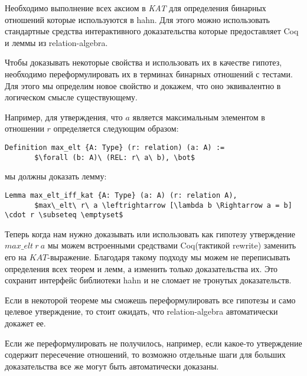 \documentclass[times
              ]{itmo-student-thesis}
\begin{document}
   Необходимо выполнение всех аксиом в \textit{KAT} для определения бинарных отношений которые используются в hahn. Для этого можно использовать стандартные средства интерактивного доказательства которые предоставляет Coq и леммы из relation-algebra.


   Чтобы доказывать некоторые свойства и использовать их в качестве гипотез, необходимо переформулировать их в терминах бинарных отношений с тестами. Для этого мы определим новое свойство и докажем, что оно эквивалентно в логическом смысле существующему.

   Например, для утверждения, что $a$ является максимальным элементом в отношении $r$ определяется следующим образом:
   \begin{lstlisting}[float=!h,caption={Определение max\_elt в hahn},label={lst1},mathescape=true]
     Definition max_elt {A: Type} (r: relation) (a: A) :=
       $\forall (b: A)\ (REL: r\ a\ b), \bot$
   \end{lstlisting}
   мы должны доказать лемму:
   \begin{lstlisting}[mathescape=truem]
     Lemma max_elt_iff_kat {A: Type} (a: A) (r: relation A),
       $max\_elt\ r\ a \leftrightarrow [\lambda b \Rightarrow a = b] \cdot r \subseteq \emptyset$
   \end{lstlisting}

    Теперь когда нам нужно доказывать или использовать как гипотезу утверждение $ max\_elt\ r\ a $
    мы можем встроенными средствами Coq(тактикой rewrite) заменить его на $ KAT $-выражение.
    Благодаря такому подходу мы можем не переписывать определения всех теорем и лемм, а изменить только доказательства их. Это сохранит интерфейс библиотеки hahn и не сломает не тронутых доказательств.


    Если в некоторой теореме мы сможешь переформулировать все гипотезы и само целевое утверждение, то стоит ожидать, что relation-algebra автоматически докажет ее.

    Если же переформулировать не получилось, например, если какое-то утверждение содержит пересечение отношений, то возможно отдельные шаги для больших доказательства все же могут быть автоматически доказаны.
\end{document}

